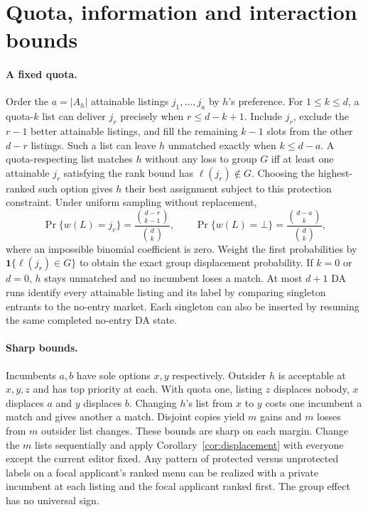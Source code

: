 \section{Quota, information and interaction bounds}\label{app:menus}
\paragraph{A fixed quota.}
Order the $a=|A_h|$ attainable listings $j_1,\ldots,j_a$ by $h$'s preference. For $1\le k\le d$, a quota-$k$ list can deliver $j_r$ precisely when $r\le d-k+1$. Include $j_r$, exclude the $r-1$ better attainable listings, and fill the remaining $k-1$ slots from the other $d-r$ listings. Such a list can leave $h$ unmatched exactly when $k\le d-a$. A quota-respecting list matches $h$ without any loss to group $G$ iff at least one attainable $j_r$ satisfying the rank bound has $\ell(j_r)\notin G$. Choosing the highest-ranked such option gives $h$ their best assignment subject to this protection constraint. Under uniform sampling without replacement,
\[
  \Pr\{w(L)=j_r\}=\frac{\binom{d-r}{k-1}}{\binom{d}{k}},
  \qquad
  \Pr\{w(L)=\bot\}=\frac{\binom{d-a}{k}}{\binom{d}{k}},
\]
where an impossible binomial coefficient is zero. Weight the first probabilities by $\mathbf1\{\ell(j_r)\in G\}$ to obtain the exact group displacement probability. If $k=0$ or $d=0$, $h$ stays unmatched and no incumbent loses a match. At most $d+1$ DA runs identify every attainable listing and its label by comparing singleton entrants to the no-entry market. Each singleton can also be inserted by resuming the same completed no-entry DA state.

\paragraph{Sharp bounds.}
Incumbents $a,b$ have sole options $x,y$ respectively. Outsider $h$ is acceptable at $x,y,z$ and has top priority at each. With quota one, listing $z$ displaces nobody, $x$ displaces $a$ and $y$ displaces $b$. Changing $h$'s list from $x$ to $y$ costs one incumbent a match and gives another a match. Disjoint copies yield $m$ gains and $m$ losses from $m$ outsider list changes. These bounds are sharp on each margin. Change the $m$ lists sequentially and apply Corollary~\ref{cor:displacement} with everyone except the current editor fixed. Any pattern of protected versus unprotected labels on a focal applicant's ranked menu can be realized with a private incumbent at each listing and the focal applicant ranked first. The group effect has no universal sign.

